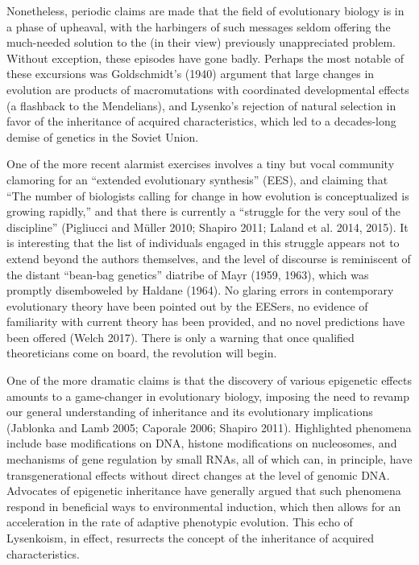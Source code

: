 \documentclass{article}
\begin{document}
Nonetheless, periodic claims are made that the field of evolutionary biology is in a phase of upheaval, with the harbingers of such messages seldom offering the much-needed solution to the (in their view) previously unappreciated problem. Without exception, these episodes have gone badly. Perhaps the most notable of these excursions was Goldschmidt's (1940) argument that large changes in evolution are products of macromutations with coordinated developmental effects (a flashback to the Mendelians), and Lysenko's rejection of natural selection in favor of the inheritance of acquired characteristics, which led to a decades-long demise of genetics in the Soviet Union.

One of the more recent alarmist exercises involves a tiny but vocal community clamoring for an “extended evolutionary synthesis” (EES), and claiming that “The number of biologists calling for change in how evolution is conceptualized is growing rapidly,” and that there is currently a “struggle for the very soul of the discipline” (Pigliucci and Müller 2010; Shapiro 2011; Laland et al. 2014, 2015). It is interesting that the list of individuals engaged in this struggle appears not to extend beyond the authors themselves, and the level of discourse is reminiscent of the distant “bean-bag genetics” diatribe of Mayr (1959, 1963), which was promptly disemboweled by Haldane (1964). No glaring errors in contemporary evolutionary theory have been pointed out by the EESers, no evidence of familiarity with current theory has been provided, and no novel predictions have been offered (Welch 2017). There is only a warning that once qualified theoreticians come on board, the revolution will begin.

One of the more dramatic claims is that the discovery of various epigenetic effects amounts to a game-changer in evolutionary biology, imposing the need to revamp our general understanding of inheritance and its evolutionary implications (Jablonka and Lamb 2005; Caporale 2006; Shapiro 2011). Highlighted phenomena include base modifications on DNA, histone modifications on nucleosomes, and mechanisms of gene regulation by small RNAs, all of which can, in principle, have transgenerational effects without direct changes at the level of genomic DNA. Advocates of epigenetic inheritance have generally argued that such phenomena respond in beneficial ways to environmental induction, which then allows for an acceleration in the rate of adaptive phenotypic evolution. This echo of Lysenkoism, in effect, resurrects the concept of the inheritance of acquired characteristics.
\end{document}
